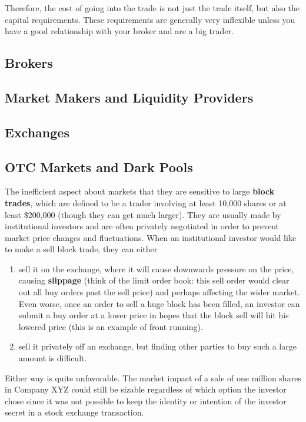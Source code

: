 \documentclass{article}
\begin{document}
    Therefore, the cost of going into the trade is not just the trade itself, but also the capital requirements. These requirements are generally very inflexible unless you have a good relationship with your broker and are a big trader. 

  \subsection{Brokers}

  \subsection{Market Makers and Liquidity Providers}

  \subsection{Exchanges}

  \subsection{OTC Markets and Dark Pools}

    The inefficient aspect about markets that they are sensitive to large \textbf{block trades}, which are defined to be a trader involving at least 10,000 shares or at least \$200,000 (though they can get much larger). They are usually made by institutional investors and are often privately negotiated in order to prevent market price changes and fluctuations. When an institutional investor would like to make a sell block trade, they can either 
    \begin{enumerate}
      \item sell it on the exchange, where it will cause downwards pressure on the price, causing \textbf{slippage} (think of the limit order book: this sell order would clear out all buy orders past the sell price) and perhaps affecting the wider market. Even worse, once an order to sell a huge block has been filled, an investor can submit a buy order at a lower price in hopes that the block sell will hit his lowered price (this is an example of front running). 
      \item sell it privately off an exchange, but finding other parties to buy such a large amount is difficult. 
    \end{enumerate}
    Either way is quite unfavorable. The market impact of a sale of one million shares in Company XYZ could still be sizable regardless of which option the investor chose since it was not possible to keep the identity or intention of the investor secret in a stock exchange transaction. 
\end{document}
